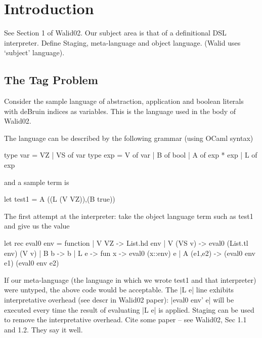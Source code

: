


\section{Introduction}

See Section 1 of Walid02. Our subject area is that of a definitional DSL
interpreter.
Define Staging, meta-language and object language. (Walid uses
`subject' language).


\subsection{The Tag Problem}



Consider the sample language of abstraction, application and boolean
literals with deBruin indices as variables. This is the language used
in the body of Walid02.

The language can be described by the following grammar (using OCaml
syntax)


\begin{code}
  type var = VZ | VS of var
  type exp = V of var | B of bool | A of exp * exp | L of exp
\end{code}

and a sample term is
\begin{code}
  let test1 = A ((L (V VZ)),(B true))
\end{code}

The first attempt at the interpreter: take the object language term
such as test1 and give us the value
\begin{code}
  let rec eval0 env = function 
  | V VZ -> List.hd env
  | V (VS v) -> eval0 (List.tl env) (V v)
  | B b -> b 
  | L e -> fun x -> eval0 (x::env) e
  | A (e1,e2) -> (eval0 env e1) (eval0 env e2) 
\end{code}

If our meta-language (the language in which we wrote test1
and that interpreter) were untyped, the above code would be acceptable.
The |L e| line exhibits interpretative overhead (see descr in Walid02
paper): |eval0 env' e| will be executed every time the result of
evaluating |L e| is applied. Staging can be used to remove the
interpretative overhead. Cite some paper -- see Walid02, Sec 1.1 and
1.2. They say it well.

